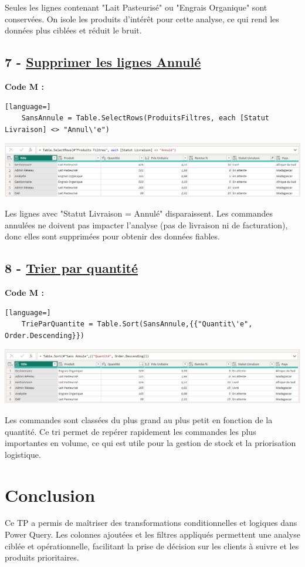 \documentclass[12pt,a4paper]{article}
\begin{document}
     Seules les lignes contenant "Lait Pasteurisé" ou "Engrais Organique" sont conservées. On isole les produits d’intérêt pour cette analyse, ce qui rend les données plus ciblées et réduit le bruit.
	\newpage
    

    \subsection*{7 - \textbf{\underline{Supprimer les lignes \og Annul\'e\fg}}} 
    \textbf{Code M :}
    \begin{lstlisting}[language=]
    SansAnnule = Table.SelectRows(ProduitsFiltres, each [Statut Livraison] <> "Annul\'e")
    \end{lstlisting}

	\includegraphics[width=\textwidth]{etape7.png}


     Les lignes avec "Statut Livraison = Annulé" disparaissent. Les commandes annulées ne doivent pas impacter l’analyse (pas de livraison ni de facturation), donc elles sont supprimées pour obtenir des données fiables.

    

    \subsection*{8 - \textbf{\underline{Trier par quantit\'e}}} 
    \textbf{Code M :}
    \begin{lstlisting}[language=]
    TrieParQuantite = Table.Sort(SansAnnule,{{"Quantit\'e", Order.Descending}})
    \end{lstlisting}

	\includegraphics[width=\textwidth]{etape8.png}


     Les commandes sont classées du plus grand au plus petit en fonction de la quantité. Ce tri permet de repérer rapidement les commandes les plus importantes en volume, ce qui est utile pour la gestion de stock et la priorisation logistique.

    

    \section*{Conclusion}
    Ce TP a permis de ma\^itriser des transformations conditionnelles et logiques dans Power Query. Les colonnes ajout\'ees et les filtres appliqu\'es permettent une analyse cibl\'ee et op\'erationnelle, facilitant la prise de d\'ecision sur les clients \`a suivre et les produits prioritaires.
\end{document}
